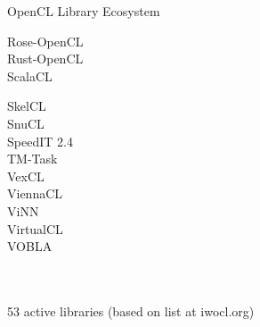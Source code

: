 \begin{frame}{OpenCL Library Ecosystem}
\begin{minipage}{0.20\textwidth}
Rose-OpenCL\\
Rust-OpenCL\\
ScalaCL\\
 \end{minipage}
  \begin{minipage}{0.19\textwidth}
SkelCL\\
SnuCL\\
SpeedIT 2.4\\
TM-Task\\
VexCL\\
ViennaCL\\
ViNN\\
VirtualCL\\
VOBLA\\
 \\
 \\
 \end{minipage}
 
 \begin{center}
  53 active libraries (based on list at iwocl.org)
 \end{center}
 
\end{frame}




